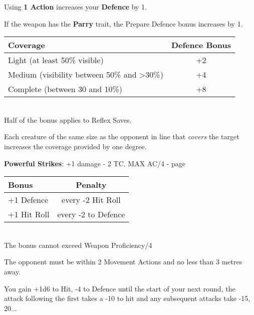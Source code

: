 \documentclass[landscape,10pt,a4paper]{article}
\begin{document}
\begin{multicols}{3}
\begin{dmbox}[title=Prepare Defence - page \pageref{prepareladifesa}]

Using \textbf{1 Action} increases your \textbf{Defence} by 1.

If the weapon has the \textbf{Parry} trait, the Prepare Defence bonus increases by 1.
\end{dmbox}

\begin{dmbox}[title=Cover - page \pageref{copertura}]
\noindent\begin{tabular}{l|c}
\textbf{Coverage} & \textbf{Defence Bonus}\\
\hline
Light (at least 50\% visible) & +2\\
Medium (visibility between 50\% and >30\%) & +4 \\
Complete (between 30 and 10\%) & +8 \\
\end{tabular}\\

Half of the bonus applies to Reflex Saves.

Each creature of the same size as the opponent in line that \emph{covers} the target increases the coverage provided by one degree.

\end{dmbox}

\begin{mybluebox}\textbf{Powerful Strikes}: +1 damage - 2 TC. MAX AC/4 - page \pageref{powerfulstrikes}\end{mybluebox}


\begin{dmbox}[title=Combat Mastery - page \pageref{combatmastery}]
\noindent\begin{tabular}{l|c}
\textbf{Bonus} & \textbf{Penalty}\\
\hline
+1 Defence & every -2 Hit Roll\\
+1 Hit Roll & every -2 to Defence
\end{tabular}\\

The bonus cannot exceed Weapon Proficiency/4
\end{dmbox}

\begin{dmbox}[title=Charge - page \pageref{charge}]

The opponent must be within 2 Movement Actions and no less than 3 metres away.

You gain +1d6 to Hit, -4 to Defence until the start of your next round, the attack following the first takes a -10 to hit and any subsequent attacks take -15, 20...


\end{dmbox}
\end{multicols}
\end{document}
